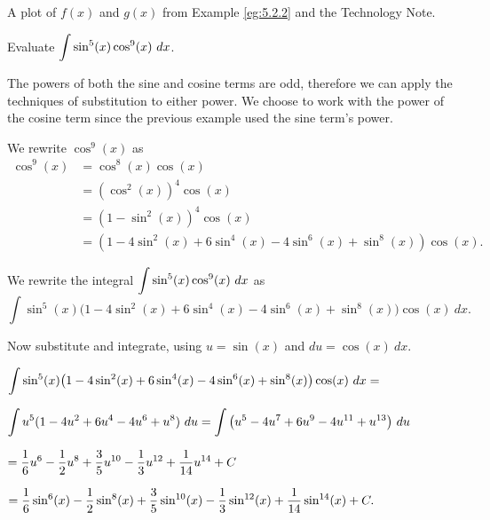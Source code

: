 \begin{marginfigure}[1cm]
\caption{A plot of $f(x)$ and $g(x)$ from Example \ref{eg:5.2.2} and the Technology Note.}
\label{F:5.2_Eg2}
\end{marginfigure}

\begin{example} \label{eg:5.2.2} %
Evaluate $\displaystyle \int\sin^5(x)\cos^9(x)\ dx$.

\solution The powers of both the sine and cosine terms are odd, therefore we can apply the techniques of substitution to either power. We choose to work with the power of the cosine term since the previous example used the sine term's power.

We rewrite $\cos^9(x)$ as
\begin{align*} \cos^9(x) &= \cos^8(x)\cos(x) \\
				&= (\cos^2(x))^4\cos(x) \\
				&= (1-\sin^2(x))^4\cos(x) \\
				&= (1-4\sin^2(x)+6\sin^4(x)-4\sin^6(x)+\sin^8(x))\cos(x).
\end{align*}

We rewrite the integral $\displaystyle \int\sin^5(x)\cos^9(x)\ dx$ as 
$$ \int\sin^5(x)\big(1-4\sin^2(x)+6\sin^4(x)-4\sin^6(x)+\sin^8(x)\big)\cos(x)\ dx.$$

Now substitute and integrate, using $u = \sin(x) $ and $du = \cos(x)\ dx$.

\noindent
$\ds \int\sin^5(x)\big(1-4\sin^2(x)+6\sin^4(x)-4\sin^6(x)+\sin^8(x)\big)\cos(x)\ dx =$

\noindent
$\displaystyle \int u^5(1-4u^2+6u^4-4u^6+u^8)\ du = \int\big(u^5-4u^7+6u^9-4u^{11}+u^{13}\big)\ du$

\noindent
$ \displaystyle = \frac16u^6-\frac12u^8+\frac35u^{10}-\frac13u^{12}+\frac{1}{14}u^{14}+C $

\noindent
$ \displaystyle = \frac16\sin^6(x)-\frac12\sin^8(x)+\frac35\sin^{10}(x)-\frac13\sin^{12}(x)+\frac{1}{14}\sin^{14}(x)+C.$
\end{example}

